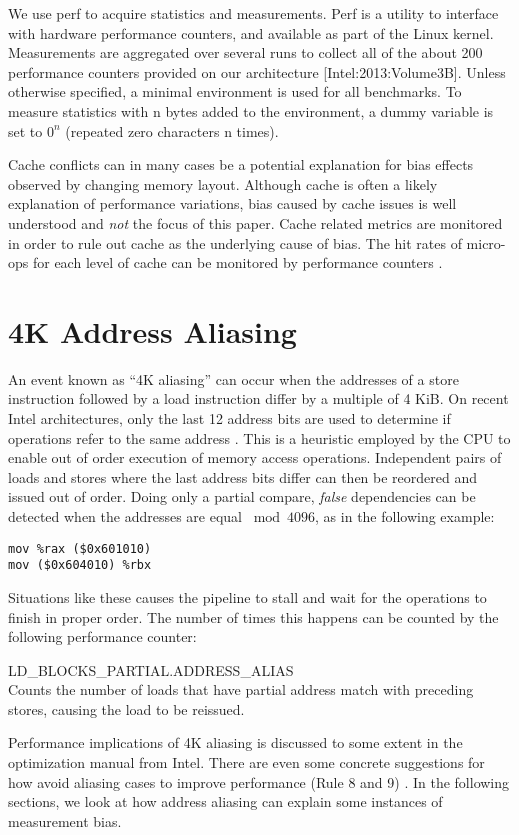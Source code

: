 \documentclass[a4paper,11pt,twocolumn,twoside]{article}
\begin{document}
We use perf to acquire statistics and measurements.
Perf is a utility to interface with hardware performance counters, and available as part of the Linux kernel.
Measurements are aggregated over several runs to collect all of the about 200 performance counters provided on our architecture [Intel:2013:Volume3B]. 
Unless otherwise specified, a minimal environment is used for all benchmarks. 
To measure statistics with n bytes added to the environment, a dummy variable is set to \(0^{n}\) (repeated zero characters n times).

Cache conflicts can in many cases be a potential explanation for bias effects observed by changing memory layout.
Although cache is often a likely explanation of performance variations, bias caused by cache issues is well understood and \emph{not} the focus of this paper.
Cache related metrics are monitored in order to rule out cache as the underlying cause of bias. 
The hit rates of micro-ops for each level of cache can be monitored by performance counters \cite{Intel:2012:OptimizationManual}.

\section{4K Address Aliasing}
An event known as “4K aliasing” can occur when the addresses of a store instruction followed by a load instruction differ by a multiple of 4 KiB.
On recent Intel architectures, only the last 12 address bits are used to determine if operations refer to the same address \cite{Intel:2012:OptimizationManual}.
This is a heuristic employed by the CPU to enable out of order execution of memory access operations.
Independent pairs of loads and stores where the last address bits differ can then be reordered and issued out of order.
Doing only a partial compare, \emph{false} dependencies can be detected when the addresses are equal $\bmod 4096$, as in the following example: 
\begin{lstlisting}[language={[x86masm]Assembler}]
mov %rax ($0x601010)
mov ($0x604010) %rbx
\end{lstlisting}
Situations like these causes the pipeline to stall and wait for the operations to finish in proper order.
The number of times this happens can be counted by the following performance counter:
\begin{description}
  \item{LD\_BLOCKS\_PARTIAL.ADDRESS\_ALIAS} \hfill \\
  Counts the number of loads that have partial address match with preceding stores, causing the load to be reissued.
\end{description}
Performance implications of 4K aliasing is discussed to some extent in the optimization manual from Intel. 
There are even some concrete suggestions for how avoid aliasing cases to improve performance (Rule 8 and 9) \cite{Intel:2012:OptimizationManual}.
In the following sections, we look at how address aliasing can explain some instances of measurement bias.
\end{document}
